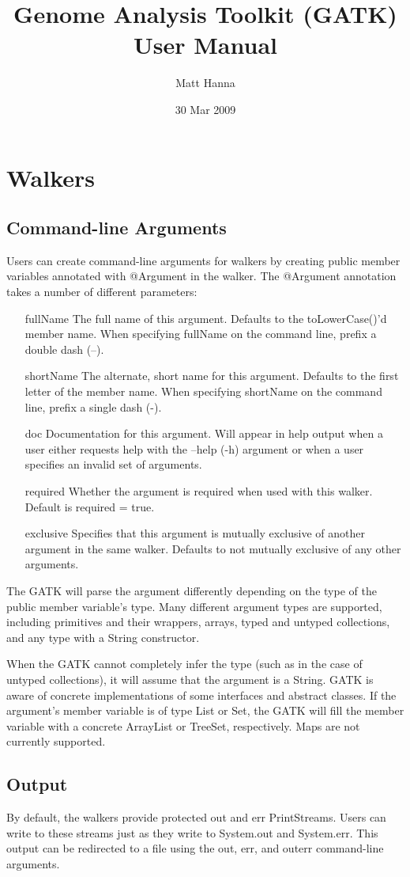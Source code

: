 \documentclass[11pt,fullpage]{article}
\begin{document}
\title{Genome Analysis Toolkit (GATK) User Manual}
\author{Matt Hanna}
\date{30 Mar 2009}
\maketitle

\section{Walkers}
\subsection{Command-line Arguments}
Users can create command-line arguments for walkers by creating public
member variables annotated with @Argument in the walker.  The
@Argument annotation takes a number of different parameters:

\begin{enumerate}
  \item [fullName] The full name of this argument.  Defaults to the
    toLowerCase()'d member name.  When specifying fullName on the 
    command line, prefix a double dash (--).
  \item [shortName] The alternate, short name for this argument.
    Defaults to the first letter of the member name.  When specifying 
    shortName on the command line, prefix a single dash (-).
  \item [doc] Documentation for this argument.  Will appear in help
    output when a user either requests help with the --help (-h)
    argument or when a user specifies an invalid set of arguments.
  \item [required] Whether the argument is required when used with
    this walker.  Default is required = true.
  \item [exclusive] Specifies that this argument is mutually
    exclusive of another argument in the same walker.  Defaults to not
    mutually exclusive of any other arguments.
\end{enumerate}

The GATK will parse the argument differently depending on the type of
the public member variable's type.  Many different argument types are 
supported, including primitives and their wrappers, arrays, typed and 
untyped collections, and any type with a String constructor.

When the GATK cannot completely infer the type (such as in the case of
untyped collections), it will assume that the argument is a String.
GATK is aware of concrete implementations of some interfaces and
abstract classes.  If the argument's member variable is of type List
or Set, the GATK will fill the member variable with a concrete
ArrayList or TreeSet, respectively.  Maps are not currently supported.

\subsection{Output}
By default, the walkers provide protected out and err PrintStreams.
Users can write to these streams just as they write to System.out and
System.err.  This output can be redirected to a file using the out,
err, and outerr command-line arguments.
\end{document}
